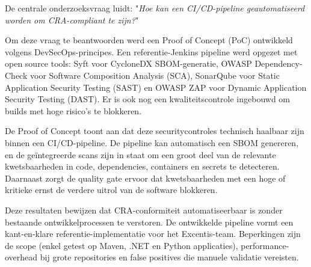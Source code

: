 De centrale onderzoeksvraag luidt: "\textit{Hoe kan een CI/CD-pipeline geautomatiseerd worden om CRA-compliant te zijn?}"

Om deze vraag te beantwoorden werd een Proof of Concept (PoC) ontwikkeld volgens DevSecOps-principes. Een referentie-Jenkins pipeline werd opgezet met open source tools: Syft voor CycloneDX SBOM-generatie, OWASP Dependency-Check voor Software Composition Analysis (SCA), SonarQube voor Static Application Security Testing (SAST) en OWASP ZAP voor Dynamic Application Security Testing (DAST). Er is ook nog een kwaliteitscontrole ingebouwd om builds met hoge risico's te blokkeren.

De Proof of Concept toont aan dat deze securitycontroles technisch haalbaar zijn binnen een CI/CD-pipeline. De pipeline kan automatisch een SBOM genereren, en de geïntegreerde scans zijn in staat om een groot deel van de relevante kwetsbaarheden in code, dependencies, containers en secrets te detecteren. Daarnaast zorgt de quality gate ervoor dat kwetsbaarheden met een hoge of kritieke ernst de verdere uitrol van de software blokkeren.

Deze resultaten bewijzen dat CRA-conformiteit automatiseerbaar is zonder\\bestaande ontwikkelprocessen te verstoren. De ontwikkelde pipeline vormt een kant-en-klare referentie-implementatie voor het Excentis-team. Beperkingen zijn de scope (enkel getest op Maven, .NET en Python applicaties), performance-\\overhead bij grote repositories en false positives die manuele validatie vereisten.
